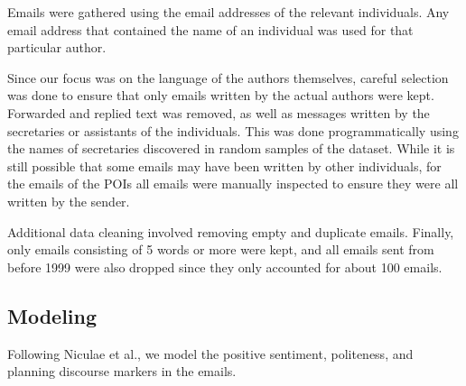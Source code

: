 
Emails were gathered using the email addresses of the relevant individuals. Any email address that contained the name of an individual was used for that particular author.

Since our focus was on the language of the authors themselves, careful selection was done to ensure that only emails written by the actual authors were kept. Forwarded and replied text was removed, as well as messages written by the secretaries or assistants of the individuals. This was done programmatically using the names of secretaries discovered in random samples of the dataset. While it is still possible that some emails may have been written by other individuals, for the emails of the POIs all emails were manually inspected to ensure they were all written by the sender. 

Additional data cleaning involved removing empty and duplicate emails. Finally, only emails consisting of 5 words or more were kept, and all emails sent from before 1999 were also dropped since they only accounted for about 100 emails.

\subsection{Modeling}

Following Niculae et al., we model the positive sentiment, politeness, and planning discourse markers in the emails.

